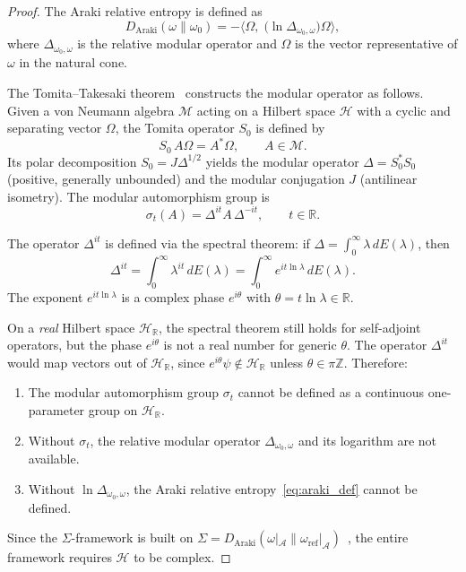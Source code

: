 \documentclass[letterpaper,twocolumn,superscriptaddress,longbibliography]{revtex4-2}
\newcommand{\hilb}{\mathcal{H}}
\newcommand{\Daraki}{D_{\mathrm{Araki}}}
\begin{document}
\begin{proof}
The Araki relative entropy is defined as~\cite{Araki1976}
\begin{equation}
  \Daraki(\omega\|\omega_0)
  = -\bigl\langle\Omega,\;
    \bigl(\ln\Delta_{\omega_0,\omega}\bigr)\Omega
  \bigr\rangle,
  \label{eq:araki_def}
\end{equation}
where $\Delta_{\omega_0,\omega}$ is the relative modular
operator and $\Omega$ is the vector representative of $\omega$
in the natural cone.

The Tomita--Takesaki theorem~\cite{Tomita1967,Takesaki1970}
constructs the modular operator as follows.
Given a von Neumann algebra $\mathcal{M}$ acting on a
Hilbert space $\hilb$ with a cyclic and separating vector
$\Omega$, the Tomita operator $S_0$ is defined by
\begin{equation}
  S_0 \, A\Omega = A^*\Omega, \qquad A \in \mathcal{M}.
  \label{eq:tomita_S}
\end{equation}
Its polar decomposition $S_0 = J\Delta^{1/2}$ yields the
modular operator $\Delta = S_0^* S_0$ (positive, generally
unbounded) and the modular conjugation $J$ (antilinear
isometry).  The modular automorphism group is
\begin{equation}
  \sigma_t(A) = \Delta^{it} A\, \Delta^{-it},
  \qquad t \in \mathbb{R}.
  \label{eq:modular_flow}
\end{equation}

The operator $\Delta^{it}$ is defined via the spectral theorem:
if $\Delta = \int_0^\infty \lambda\, dE(\lambda)$, then
\begin{equation}
  \Delta^{it} = \int_0^\infty \lambda^{it}\, dE(\lambda)
  = \int_0^\infty e^{it\ln\lambda}\, dE(\lambda).
  \label{eq:spectral_it}
\end{equation}
The exponent $e^{it\ln\lambda}$ is a complex phase $e^{i\theta}$
with $\theta = t\ln\lambda \in \mathbb{R}$.

On a \emph{real} Hilbert space $\hilb_{\mathbb{R}}$,
the spectral theorem still holds for self-adjoint operators,
but the phase $e^{i\theta}$ is not a real number for generic
$\theta$.  The operator $\Delta^{it}$ would map vectors out
of $\hilb_{\mathbb{R}}$, since $e^{i\theta}\psi \notin
\hilb_{\mathbb{R}}$ unless $\theta \in \pi\mathbb{Z}$.
Therefore:
\begin{enumerate}
  \item The modular automorphism group $\sigma_t$ cannot be
        defined as a continuous one-parameter group on
        $\hilb_{\mathbb{R}}$.
  \item Without $\sigma_t$, the relative modular operator
        $\Delta_{\omega_0,\omega}$ and its logarithm are
        not available.
  \item Without $\ln\Delta_{\omega_0,\omega}$, the Araki
        relative entropy~\eqref{eq:araki_def} cannot be
        defined.
\end{enumerate}
Since the $\Sigma$-framework is built on
$\Sigma = \Daraki(\omega|_{\mathcal{A}} \|
\omega_{\mathrm{ref}}|_{\mathcal{A}})$~\cite{PaperIV},
the entire framework requires $\hilb$ to be complex.
\end{proof}
\end{document}
